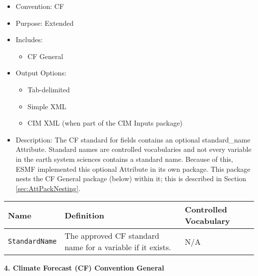\begin{itemize}
    \item Convention: CF
    \item Purpose: Extended
    \item Includes: 
    \begin{itemize}
        \item CF General
    \end{itemize}
    \item Output Options: 
    \begin{itemize}
        \item Tab-delimited
        \item Simple XML
        \item CIM XML (when part of the CIM Inputs package)
    \end{itemize} 
    \item Description: The CF standard for fields contains an optional standard\_name Attribute. Standard names are controlled vocabularies and not every variable in the earth system sciences contains a standard name. Because of this, ESMF implemented this optional Attribute in its own package. This package nests the CF General package (below) within it; this is described in Section \ref{sec:AttPackNesting}.
\end{itemize}

\begin{tabular}{|p{5cm}|p{5cm}|p{4cm}|}
    \hline\hline
    {\bf Name } & {\bf Definition} & {\bf Controlled Vocabulary} \\
    \hline\hline
    {\tt StandardName} & The approved CF standard name for a variable if it exists. &  N/A\\
    \hline\hline
\end{tabular}

\vspace{.20in}

{\bf 4. Climate Forecast (CF) Convention General}

